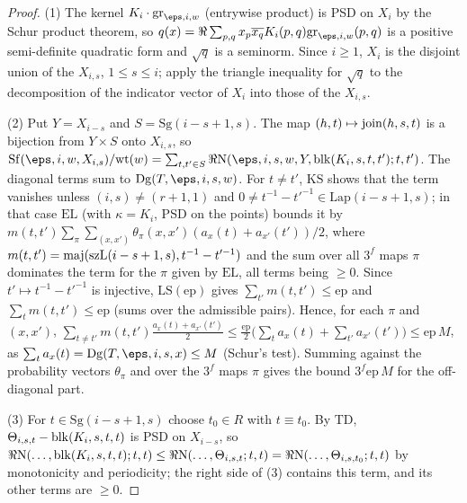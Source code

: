 \begin{proof}
(1) The kernel $K_i\cdot\thmSgram_{\eps,i,w}$ (entrywise product) is PSD on $X_i$ by the Schur product theorem, so
$q(x)=\Re\sum_{p,q}x_p\overline{x_q}K_i(p,q)\thmSgram_{\eps,i,w}(p,q)$ is a positive semi-definite quadratic form and
$\sqrt q$ is a seminorm. Since $i\ge1$, $X_i$ is the disjoint union of the $X_{i,s}$, $1\le s\le i$; apply the triangle
inequality for $\sqrt q$ to the decomposition of the indicator vector of $X_i$ into those of the $X_{i,s}$.

(2) Put $Y=X_{i-s}$ and $S=\mathrm{Sg}(i-s+1,s)$. The map $(h,t)\mapsto\operatorname{join}(h,s,t)$ is a bijection from $Y\times S$
onto $X_{i,s}$, so $\thmSSf(\eps,i,w,X_{i,s})/\mathrm{wt}(w)=\sum_{t,t'\in S}\Re\thmSNst(\eps,i,s,w,Y,\thmSblk(K_i,s,t,t');t,t')$.
The diagonal terms sum to $\thmSDg(T,\eps,i,s,w)$. For $t\ne t'$, $\mathrm{KS}$ shows that the term vanishes
unless $(i,s)\ne(r+1,1)$ and $0\ne t^{-1}-t'^{-1}\in\mathrm{Lap}(i-s+1,s)$; in that case $\mathrm{EL}$ (with
$\kappa=K_i$, PSD on the points) bounds it by $m(t,t')\sum_\pi\sum_{(x,x')}\theta_\pi(x,x')(a_x(t)+a_{x'}(t'))/2$, where
$m(t,t')=\operatorname{maj}(\mathrm{szL}(i-s+1,s),t^{-1}-t'^{-1})$ and the sum over all $3^f$ maps $\pi$ dominates the term for
the $\pi$ given by $\mathrm{EL}$, all terms being $\ge0$. Since $t'\mapsto t^{-1}-t'^{-1}$ is injective,
$\mathrm{LS}(\mathrm{ep})$ gives $\sum_{t'}m(t,t')\le\mathrm{ep}$ and $\sum_tm(t,t')\le\mathrm{ep}$ (sums over the
admissible pairs). Hence, for each $\pi$ and $(x,x')$,
$\sum_{t\ne t'}m(t,t')\frac{a_x(t)+a_{x'}(t')}2\le\frac{\mathrm{ep}}2\bigl(\sum_ta_x(t)+\sum_{t'}a_{x'}(t')\bigr)\le\mathrm{ep}\,M$,
as $\sum_ta_x(t)=\thmSDg(T,\eps,i,s,x)\le M$ (Schur's test). Summing against the probability vectors $\theta_\pi$ and over
the $3^f$ maps $\pi$ gives the bound $3^f\mathrm{ep}\,M$ for the off-diagonal part.

(3) For $t\in\mathrm{Sg}(i-s+1,s)$ choose $t_0\in R$ with $t\equiv t_0$. By $\mathrm{TD}$,
$\Theta_{i,s,t}-\operatorname{blk}(K_i,s,t,t)$ is PSD on $X_{i-s}$, so $\Re\mathrm{N}(\dots,\operatorname{blk}(K_i,s,t,t);t,t)\le
\Re\mathrm{N}(\dots,\Theta_{i,s,t};t,t)=\Re\mathrm{N}(\dots,\Theta_{i,s,t_0};t,t)$ by monotonicity and periodicity; the right
side of (3) contains this term, and its other terms are $\ge0$.


\end{proof}
